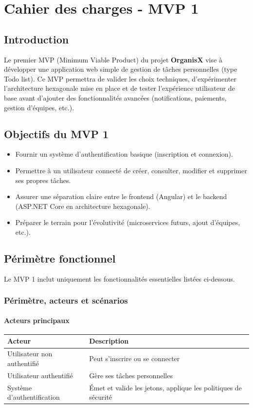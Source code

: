 \chapter{Cahier des charges - MVP 1}

\section{Introduction}
Le premier MVP (Minimum Viable Product) du projet \textbf{OrganisX} vise à développer une application web simple de gestion de tâches personnelles (type Todo list). 
Ce MVP permettra de valider les choix techniques, d’expérimenter l’architecture hexagonale mise en place et de tester l’expérience utilisateur de base avant d’ajouter des fonctionnalités avancées (notifications, paiements, gestion d’équipes, etc.).

\section{Objectifs du MVP 1}
\begin{itemize}
	\item Fournir un système d’authentification basique (inscription et connexion).
	\item Permettre à un utilisateur connecté de créer, consulter, modifier et supprimer ses propres tâches.
	\item Assurer une séparation claire entre le frontend (Angular) et le backend (ASP.NET Core en architecture hexagonale).
	\item Préparer le terrain pour l’évolutivité (microservices futurs, ajout d’équipes, etc.).
\end{itemize}

\section{Périmètre fonctionnel}
Le MVP 1 inclut uniquement les fonctionnalités essentielles listées ci-dessous.

\subsection{Périmètre, acteurs et scénarios}
\subsubsection{Acteurs principaux}
\begin{tabular}{|l|p{10cm}|}
	\hline
	\textbf{Acteur} & \textbf{Description} \\ \hline
	Utilisateur non authentifié & Peut s'inscrire ou se connecter \\ \hline
	Utilisateur authentifié & Gère ses tâches personnelles \\ \hline
	Système d'authentification & Émet et valide les jetons, applique les politiques de sécurité \\ \hline
\end{tabular}

